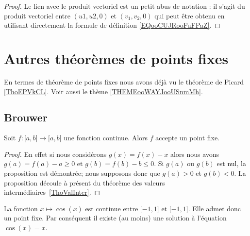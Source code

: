 \begin{proof}
	Le lien avec le produit vectoriel est un petit abus de notation : il s'agit du produit vectoriel entre \( (u1, u2, 0)\) et \( (v_1,v_2,0)\) qui peut être obtenu en utilisant directement la formule de définition \eqref{EQooCUJRooFuFPaZ}.
\end{proof}

\section{Autres théorèmes de points fixes}
\label{SECooDWMPooWZgzRZ}

En termes de théorème de points fixes nous avons déjà vu le théorème de Picard \ref{ThoEPVkCL}. Voir aussi le thème \ref{THEMEooWAYJooUSnmMh}.

\subsection{Brouwer}
\label{subSecZCCmMnQ}

\begin{proposition}
	Soit \( f\colon \mathopen[ a , b \mathclose]\to \mathopen[ a , b \mathclose]\) une fonction continue. Alors \( f\) accepte un point fixe.
\end{proposition}

\begin{proof}
	En effet si nous considérons \( g(x)=f(x)-x\) alors nous avons \( g(a)=f(a)-a\geq 0\) et \( g(b)=f(b)-b\leq 0\). Si \( g(a)\) ou \( g(b)\) est nul, la proposition est démontrée; nous supposons donc que \( g(a)>0\) et \( g(b)<0\). La proposition découle à présent du théorème des valeurs intermédiaires~\ref{ThoValInter}.
\end{proof}

\begin{example}
	La fonction \( x\mapsto\cos(x)\) est continue entre \( \mathopen[ -1 , 1 \mathclose]\) et \( \mathopen[ -1 , 1 \mathclose]\). Elle admet donc un point fixe. Par conséquent il existe (au moins) une solution à l'équation \( \cos(x)=x\).
\end{example}

